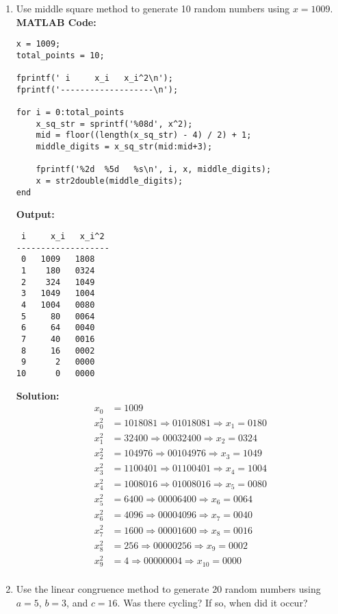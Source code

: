 \documentclass[legalpaper,11pt,extrafontsizes,oneside,openany,x11names]{memoir}
\begin{document}
\begin{enumerate}
    \item Use middle square method to generate 10 random numbers using \( x = 1009 \). \\
\textbf{MATLAB Code:}
\begin{lstlisting}
x = 1009;
total_points = 10;

fprintf(' i     x_i   x_i^2\n');
fprintf('-------------------\n');

for i = 0:total_points
    x_sq_str = sprintf('%08d', x^2); 
    mid = floor((length(x_sq_str) - 4) / 2) + 1;
    middle_digits = x_sq_str(mid:mid+3); 
    
    fprintf('%2d  %5d   %s\n', i, x, middle_digits);
    x = str2double(middle_digits);
end
\end{lstlisting}

\textbf{Output:}
\begin{lstlisting}
 i     x_i   x_i^2
-------------------
 0   1009   1808
 1    180   0324
 2    324   1049
 3   1049   1004
 4   1004   0080
 5     80   0064
 6     64   0040
 7     40   0016
 8     16   0002
 9      2   0000
10      0   0000
\end{lstlisting}

\textbf{Solution:}
\begin{align*}
x_0 &= 1009 \\
x_0^2 &= 1018081 \Rightarrow 01018081 \Rightarrow x_1 = 0180 \\
x_1^2 &= 32400 \Rightarrow 00032400 \Rightarrow x_2 = 0324 \\
x_2^2 &= 104976 \Rightarrow 00104976 \Rightarrow x_3 = 1049 \\
x_3^2 &= 1100401 \Rightarrow 01100401 \Rightarrow x_4 = 1004 \\
x_4^2 &= 1008016 \Rightarrow 01008016 \Rightarrow x_5 = 0080 \\
x_5^2 &= 6400 \Rightarrow 00006400 \Rightarrow x_6 = 0064 \\
x_6^2 &= 4096 \Rightarrow 00004096 \Rightarrow x_7 = 0040 \\
x_7^2 &= 1600 \Rightarrow 00001600 \Rightarrow x_8 = 0016 \\
x_8^2 &= 256 \Rightarrow 00000256 \Rightarrow x_9 = 0002 \\
x_9^2 &= 4 \Rightarrow 00000004 \Rightarrow x_{10} = 0000 \\
\end{align*}

\newpage

    \item Use the linear congruence method to generate 20 random numbers using \( a = 5 \), \( b = 3 \), and \( c = 16 \). Was there cycling? If so, when did it occur?


\end{enumerate}
\end{document}
